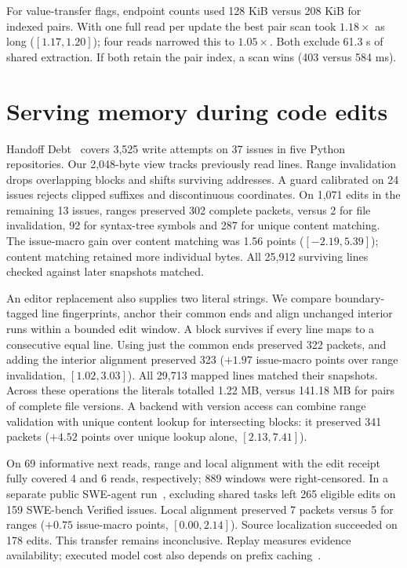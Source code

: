 \documentclass[conference]{IEEEtran}
\begin{document}
For value-transfer flags, endpoint counts used 128 KiB versus 208 KiB for indexed pairs. With one full read per update the best pair scan took $1.18\times$ as long ($[1.17,1.20]$); four reads narrowed this to $1.05\times$. Both exclude 61.3 s of shared extraction. If both retain the pair index, a scan wins (403 versus 584 ms).

\section{Serving memory during code edits}
Handoff Debt~\cite{handoff} covers 3,525 write attempts on 37 issues in five Python repositories. Our 2,048-byte view tracks previously read lines. Range invalidation drops overlapping blocks and shifts surviving addresses. A guard calibrated on 24 issues rejects clipped suffixes and discontinuous coordinates. On 1,071 edits in the remaining 13 issues, ranges preserved 302 complete packets, versus 2 for file invalidation, 92 for syntax-tree symbols and 287 for unique content matching. The issue-macro gain over content matching was 1.56 points ($[-2.19,5.39]$); content matching retained more individual bytes. All 25,912 surviving lines checked against later snapshots matched.

An editor replacement also supplies two literal strings. We compare boundary-tagged line fingerprints, anchor their common ends and align unchanged interior runs within a bounded edit window. A block survives if every line maps to a consecutive equal line. Using just the common ends preserved 322 packets, and adding the interior alignment preserved 323 ($+1.97$ issue-macro points over range invalidation, $[1.02,3.03]$). All 29,713 mapped lines matched their snapshots. Across these operations the literals totalled 1.22 MB, versus 141.18 MB for pairs of complete file versions. A backend with version access can combine range validation with unique content lookup for intersecting blocks: it preserved 341 packets ($+4.52$ points over unique lookup alone, $[2.13,7.41]$).

On 69 informative next reads, range and local alignment with the edit receipt fully covered 4 and 6 reads, respectively; 889 windows were right-censored. In a separate public SWE-agent run~\cite{swe-run}, excluding shared tasks left 265 eligible edits on 159 SWE-bench Verified issues. Local alignment preserved 7 packets versus 5 for ranges ($+0.75$ issue-macro points, $[0.00,2.14]$). Source localization succeeded on 178 edits. This transfer remains inconclusive. Replay measures evidence availability; executed model cost also depends on prefix caching~\cite{physical}.
\end{document}
